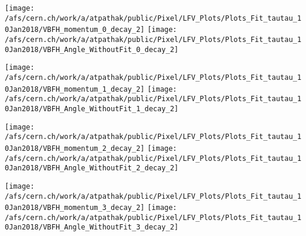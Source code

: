 \documentclass{beamer}
\begin{document}
\begin{frame}
\begin{normalsize}
\begin{center}
\texttt{[image: /afs/cern.ch/work/a/atpathak/public/Pixel/LFV\_Plots/Plots\_Fit\_tautau\_10Jan2018/VBFH\_momentum\_0\_decay\_2]}
\texttt{[image: /afs/cern.ch/work/a/atpathak/public/Pixel/LFV\_Plots/Plots\_Fit\_tautau\_10Jan2018/VBFH\_Angle\_WithoutFit\_0\_decay\_2]} 
\end{center}
\end{normalsize}
\end {frame}
\begin{frame}
\begin{normalsize}
\begin{center}
\texttt{[image: /afs/cern.ch/work/a/atpathak/public/Pixel/LFV\_Plots/Plots\_Fit\_tautau\_10Jan2018/VBFH\_momentum\_1\_decay\_2]}
\texttt{[image: /afs/cern.ch/work/a/atpathak/public/Pixel/LFV\_Plots/Plots\_Fit\_tautau\_10Jan2018/VBFH\_Angle\_WithoutFit\_1\_decay\_2]} 
\end{center}
\end{normalsize}
\end {frame}
\begin{frame}
\begin{normalsize}
\begin{center}
\texttt{[image: /afs/cern.ch/work/a/atpathak/public/Pixel/LFV\_Plots/Plots\_Fit\_tautau\_10Jan2018/VBFH\_momentum\_2\_decay\_2]}
\texttt{[image: /afs/cern.ch/work/a/atpathak/public/Pixel/LFV\_Plots/Plots\_Fit\_tautau\_10Jan2018/VBFH\_Angle\_WithoutFit\_2\_decay\_2]} 
\end{center}
\end{normalsize}
\end {frame}
\begin{frame}
\begin{normalsize}
\begin{center}
\texttt{[image: /afs/cern.ch/work/a/atpathak/public/Pixel/LFV\_Plots/Plots\_Fit\_tautau\_10Jan2018/VBFH\_momentum\_3\_decay\_2]}
\texttt{[image: /afs/cern.ch/work/a/atpathak/public/Pixel/LFV\_Plots/Plots\_Fit\_tautau\_10Jan2018/VBFH\_Angle\_WithoutFit\_3\_decay\_2]} 
\end{center}
\end{normalsize}
\end {frame}
\end{document}
